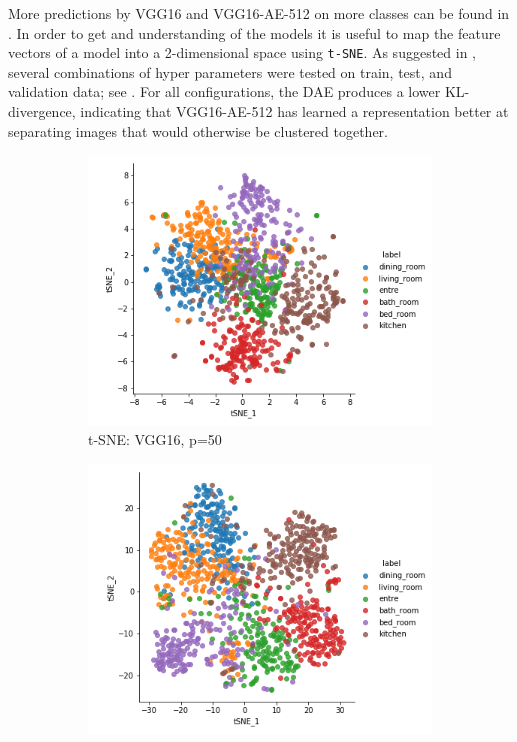 More predictions by VGG16 and VGG16-AE-512 on more classes can be found in .
\newline
\newline
In order to get and understanding of the models it is useful to map the feature vectors of a model into a 2-dimensional space using \texttt{t-SNE}\autocite{Chu2017}\autocite{HintonScience2006}. 
As suggested in \autocite{wattenberg2016how}, several combinations of hyper parameters were tested on train, test, and validation data; see .
For all configurations, the DAE produces a lower KL-divergence, indicating that VGG16-AE-512 has learned a representation better at separating images that would otherwise be clustered together.

\begin{figure}[H]
    \centering
    \begin{subfigure}[b]{0.47\textwidth}
      \includegraphics[width=\textwidth]{pictures/plots/tsne_vgg16}
      \caption{t-SNE: VGG16, p=50}
      \label{fig:tsne1}
    \end{subfigure}
    \begin{subfigure}[b]{0.47\textwidth}
      \includegraphics[width=\textwidth]{pictures/plots/tsne_vgg16_dae}

\end{subfigure}
\end{figure}
